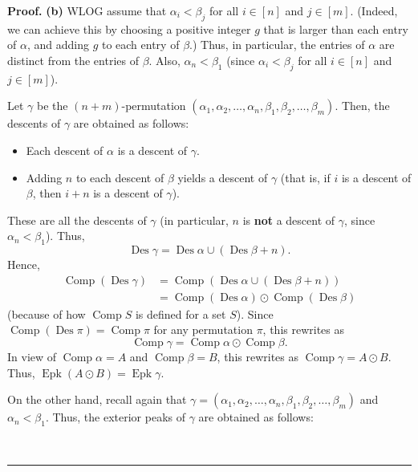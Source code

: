 \documentclass[numbers=enddot,12pt,final,onecolumn,notitlepage]{scrartcl}%
\theoremstyle{definition}
\newenvironment{proof}[1][Proof]{\noindent\textbf{#1.} }{\ \rule{0.5em}{0.5em}}
\newenvironment{verlong}{}{}
\begin{document}
\begin{verlong}
\begin{proof}
\textbf{(b)} WLOG assume that $\alpha_{i}<\beta_{j}$ for all $i\in\left[
n\right]  $ and $j\in\left[  m\right]  $. (Indeed, we can achieve this by
choosing a positive integer $g$ that is larger than each entry of $\alpha$,
and adding $g$ to each entry of $\beta$.) Thus, in particular, the entries of
$\alpha$ are distinct from the entries of $\beta$. Also, $\alpha_{n}<\beta
_{1}$ (since $\alpha_{i}<\beta_{j}$ for all $i\in\left[  n\right]  $ and
$j\in\left[  m\right]  $).

Let $\gamma$ be the $\left(  n+m\right)  $-permutation $\left(  \alpha
_{1},\alpha_{2},\ldots,\alpha_{n},\beta_{1},\beta_{2},\ldots,\beta_{m}\right)
$. Then, the descents of $\gamma$ are obtained as follows:

\begin{itemize}
\item Each descent of $\alpha$ is a descent of $\gamma$.

\item Adding $n$ to each descent of $\beta$ yields a descent of $\gamma$ (that
is, if $i$ is a descent of $\beta$, then $i+n$ is a descent of $\gamma$).
\end{itemize}

These are all the descents of $\gamma$ (in particular, $n$ is \textbf{not} a
descent of $\gamma$, since $\alpha_{n}<\beta_{1}$). Thus,%
\[
\operatorname*{Des}\gamma=\operatorname*{Des}\alpha\cup\left(
\operatorname*{Des}\beta+n\right)  .
\]
Hence,%
\begin{align*}
\operatorname*{Comp}\left(  \operatorname*{Des}\gamma\right)   &
=\operatorname*{Comp}\left(  \operatorname*{Des}\alpha\cup\left(
\operatorname*{Des}\beta+n\right)  \right) \\
&  =\operatorname*{Comp}\left(  \operatorname*{Des}\alpha\right)
\odot\operatorname*{Comp}\left(  \operatorname*{Des}\beta\right)
\end{align*}
(because of how $\operatorname*{Comp}S$ is defined for a set $S$). Since
$\operatorname*{Comp}\left(  \operatorname*{Des}\pi\right)
=\operatorname*{Comp}\pi$ for any permutation $\pi$, this rewrites as%
\[
\operatorname*{Comp}\gamma=\operatorname*{Comp}\alpha\odot\operatorname*{Comp}%
\beta.
\]
In view of $\operatorname*{Comp}\alpha=A$ and $\operatorname*{Comp}\beta=B$,
this rewrites as $\operatorname*{Comp}\gamma=A\odot B$. Thus,
$\operatorname*{Epk}\left(  A\odot B\right)  =\operatorname*{Epk}\gamma$.

On the other hand, recall again that $\gamma=\left(  \alpha_{1},\alpha
_{2},\ldots,\alpha_{n},\beta_{1},\beta_{2},\ldots,\beta_{m}\right)  $ and
$\alpha_{n}<\beta_{1}$. Thus, the exterior peaks of $\gamma$ are obtained as follows:


\end{proof}
\end{verlong}
\end{document}
